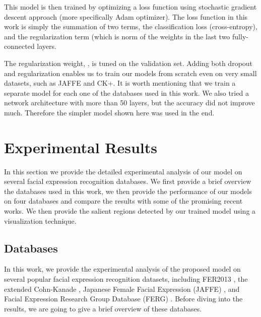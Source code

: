 \documentclass[conference]{IEEEtran}
\begin{document}
This model is then trained by optimizing a loss function using  stochastic gradient descent approach (more specifically Adam optimizer). The loss function in this work is simply the summation of two terms, the classification loss (cross-entropy), and the regularization term (which is  norm of the weights in the last two fully-connected layers.



The regularization weight, , is tuned on the validation set. 
Adding both dropout and  regularization enables us to train our models from scratch even on very small datasets, such as JAFFE and CK+. 
It is worth mentioning that we train a separate model for each one of the databases used in this work.
We also tried a network architecture with more than 50 layers, but the accuracy did not improve much. Therefore the simpler model shown here was used in the end.







\section{Experimental Results}
In this section we provide the detailed experimental analysis of our model on several facial expression recognition databases. We first provide a brief overview the databases used in this work, we then provide the performance of our models on four databases and compare the results with some of the promising recent works. 
We then provide the salient regions detected by our trained model using a visualization technique. 
\subsection{Databases}
In this work, we provide the experimental analysis of the proposed model on several popular facial expression recognition datasets, including FER2013 \cite{carrier2013fer}, the extended Cohn-Kanade \cite{ckplus}, Japanese Female Facial Expression (JAFFE) \cite{lyons1998japanese}, and Facial Expression Research Group Database (FERG) \cite{aneja2016modeling}.
Before diving into the results, we are going to give a brief overview of these databases.
\end{document}
